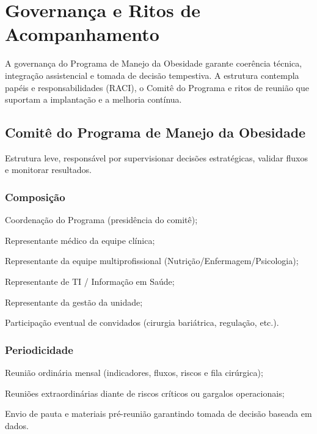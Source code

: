 \documentclass[12pt]{article}
\begin{document}
\FGVNewPage

\section{Governança e Ritos de Acompanhamento}
\label{sec:org5a2fc12}
A governança do Programa de Manejo da Obesidade garante coerência técnica, integração assistencial e tomada de decisão tempestiva. A estrutura contempla papéis e responsabilidades (RACI), o Comitê do Programa e ritos de reunião que suportam a implantação e a melhoria contínua.

\subsection{Comitê do Programa de Manejo da Obesidade}
\label{sec:org1855f53}
Estrutura leve, responsável por supervisionar decisões estratégicas, validar fluxos e monitorar resultados.

\subsubsection{Composição}
\label{sec:orga2bd56c}
\begin{hlevelthree}
\item Coordenação do Programa (presidência do comitê);
\item Representante médico da equipe clínica;
\item Representante da equipe multiprofissional (Nutrição/Enfermagem/Psicologia);
\item Representante de TI / Informação em Saúde;
\item Representante da gestão da unidade;
\item Participação eventual de convidados (cirurgia bariátrica, regulação, etc.).
\end{hlevelthree}

\subsubsection{Periodicidade}
\label{sec:org3ac771c}
\begin{hlevelthree}
\item Reunião ordinária mensal (indicadores, fluxos, riscos e fila cirúrgica);
\item Reuniões extraordinárias diante de riscos críticos ou gargalos operacionais;
\item Envio de pauta e materiais pré-reunião garantindo tomada de decisão baseada em dados.
\end{hlevelthree}
\end{document}
